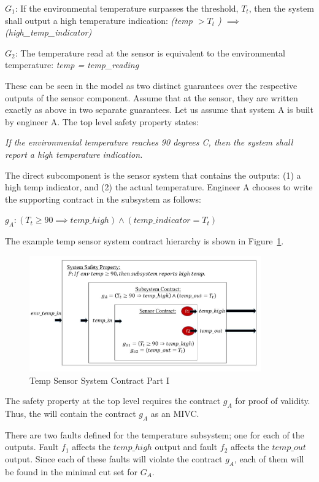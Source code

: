 $G_1$: If the environmental temperature surpasses the threshold, $T_t$, then the system shall output a high temperature indication: \textit{(temp $> T_t$ ) $\implies$ (high\_temp\_indicator)}

$G_2$: The temperature read at the sensor is equivalent to the environmental temperature: \textit{temp = temp\_reading} 

These can be seen in the model as two distinct guarantees over the respective outputs of the sensor component. Assume that at the sensor, they are written exactly as above in two separate guarantees. Let us assume that system A is built by engineer A. The top level safety property states: 
\begin{center}
    \textit{If the environmental temperature reaches 90 degrees C, then the system shall report a high temperature indication.}
\end{center}

The direct subcomponent is the sensor system that contains the outputs: (1) a high temp indicator, and (2) the actual temperature. Engineer A chooses to write the supporting contract in the subsystem as follows: 
\begin{center}
    $g_A: (T_t \geq 90 \implies temp\_high) \land (temp\_indicator = T_t)$ 
\end{center}
The example temp sensor system contract hierarchy is shown in Figure~\ref{fig:granularityEx1}.  

\begin{figure}[h!]
\begin{center}
\includegraphics[width=10cm]{images/granEx1.jpg}
\caption{Temp Sensor System Contract Part I} \label{fig:granularityEx1}
\end{center}
\end{figure}

The safety property at the top level requires the contract $g_A$ for proof of validity. Thus, the \aivcalg will contain the contract $g_A$ as an MIVC. 

There are two faults defined for the temperature subsystem; one for each of the outputs. Fault $f_1$ affects the $temp\_high$ output and fault $f_2$ affects the $temp\_out$ output. Since each of these faults will violate the contract $g_A$, each of them will be found in the minimal cut set for $G_A$.

